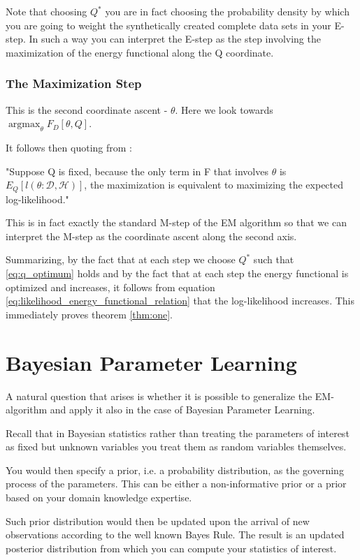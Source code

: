 \documentclass[11pt]{article}
\begin{document}
\begin{article}
Note that choosing \(Q^*\) you are in fact choosing the probability
density by which you are going to weight the synthetically created
complete data sets in your E-step. In such a way you can interpret
the E-step as the step involving the maximization of the energy
functional along the Q coordinate.

\subsubsection{The Maximization Step}
\label{sec:orgbec8899}

This is the second coordinate ascent - \(\theta\). Here we look
towards \(\operatorname*{argmax}_{\theta} F_D[\theta, Q]\).

It follows then quoting from
\cite{koller2009probabilistic}:

"Suppose Q is fixed, because the only term in F that involves \(\theta\) is
\(E_Q[l (\theta: \mathcal{D}, \mathcal{H})]\), the maximization is
equivalent to maximizing the expected log-likelihood."

This is in fact exactly the standard M-step of the EM algorithm so
that we can interpret the M-step as the coordinate ascent along
the second axis. 

Summarizing, by the fact that at each step we choose \(Q^*\) such
that \ref{eq:q_optimum} holds and by the fact that at each step the
energy functional is optimized and increases, it follows from
equation \ref{eq:likelihood_energy_functional_relation} that the
log-likelihood increases. This immediately proves theorem
\ref{thm:one}.

\newpage

\section{Bayesian Parameter Learning}
\label{bayes-parameter-learning}
A natural question that arises is whether it is possible to
generalize the EM-algorithm and apply it also in the case of
Bayesian Parameter Learning.

Recall that in Bayesian statistics rather than treating the
parameters of interest as fixed but unknown variables you treat
them as random variables themselves.

You would then specify a prior, i.e. a probability distribution, as
the governing process of the parameters. This can be either a
non-informative prior or a prior based on your domain knowledge
expertise.

Such prior distribution would then be updated upon the arrival of
new observations according to the well known Bayes Rule. The result
is an updated posterior distribution from which you can compute your
statistics of interest.



\end{article}
\end{document}
